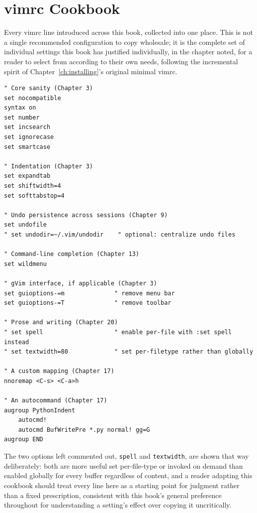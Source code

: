 \chapter{vimrc Cookbook}
\label{app:vimrc}

Every vimrc line introduced across this book, collected into one place. This is not a single recommended configuration to copy wholesale; it is the complete set of individual settings this book has justified individually, in the chapter noted, for a reader to select from according to their own needs, following the incremental spirit of Chapter~\ref{ch:installing}'s original minimal vimrc.

\begin{lstlisting}
" Core sanity (Chapter 3)
set nocompatible
syntax on
set number
set incsearch
set ignorecase
set smartcase

" Indentation (Chapter 3)
set expandtab
set shiftwidth=4
set softtabstop=4

" Undo persistence across sessions (Chapter 9)
set undofile
" set undodir=~/.vim/undodir    " optional: centralize undo files

" Command-line completion (Chapter 13)
set wildmenu

" gVim interface, if applicable (Chapter 3)
set guioptions-=m              " remove menu bar
set guioptions-=T              " remove toolbar

" Prose and writing (Chapter 20)
" set spell                    " enable per-file with :set spell instead
" set textwidth=80             " set per-filetype rather than globally

" A custom mapping (Chapter 17)
nnoremap <C-s> <C-a>h

" An autocommand (Chapter 17)
augroup PythonIndent
    autocmd!
    autocmd BufWritePre *.py normal! gg=G
augroup END
\end{lstlisting}

The two options left commented out, \texttt{spell} and \texttt{textwidth}, are shown that way deliberately: both are more useful set per-file-type or invoked on demand than enabled globally for every buffer regardless of content, and a reader adapting this cookbook should treat every line here as a starting point for judgment rather than a fixed prescription, consistent with this book's general preference throughout for understanding a setting's effect over copying it uncritically.
